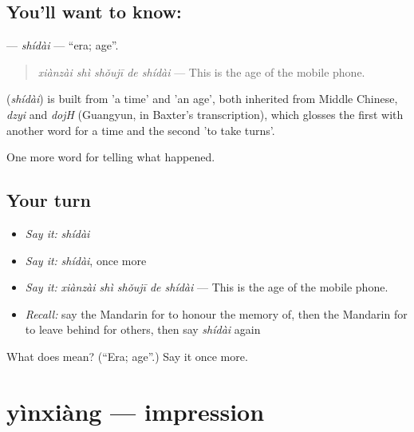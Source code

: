 \subsection*{You'll want to know: }
\textbf{} — \emph{shídài} — \textquotedblleft{}era; age\textquotedblright{}.

\begin{quote}
\textbf{} \emph{xiànzài shì shǒujī de shídài} — This is the age of the mobile phone.
\end{quote}

\begin{cousinweb}
\textbf{} (\emph{shídài}) is built from  'a time' and  'an age', both inherited from Middle Chinese, \emph{dzyi} and \emph{dojH} (Guangyun, in Baxter's transcription), which glosses the first with another word for a time and the second 'to take turns'.
\end{cousinweb}

\begin{grammarlens}[title={What you've built}]
One more word for telling what happened.
\end{grammarlens}

\subsection*{Your turn}
\begin{itemize}
\raggedright
  \item \emph{Say it:} \emph{shídài}
  \item \emph{Say it:} \emph{shídài}, once more
  \item \emph{Say it:} \emph{xiànzài shì shǒujī de shídài} — This is the age of the mobile phone.
  \item \emph{Recall:} say the Mandarin for to honour the memory of, then the Mandarin for to leave behind for others, then say \emph{shídài} again
\end{itemize}

\begin{tcolorbox}[breakable,colback=teal!4,colframe=teal!35!black,title={Before you move on}]
What does  mean? (\textquotedblleft{}Era; age\textquotedblright{}.) Say it once more.
\end{tcolorbox}
\section[yìnxiàng]{yìnxiàng — impression}

